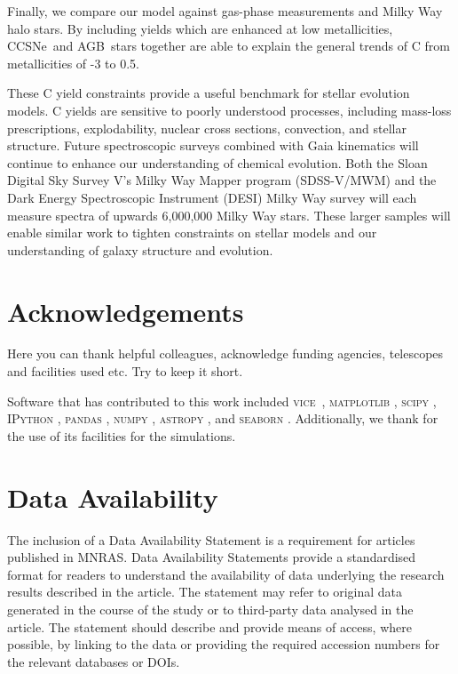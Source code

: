 \documentclass[fleqn,usenatbib]{mnras}
\newcommand{\VICE}{\textsc{vice}}
\newcommand{\agb}{AGB}
\newcommand{\cc}{CCSNe}
\begin{document}
Finally, we compare our model against gas-phase measurements and Milky Way halo stars. By including yields which are enhanced at low metallicities, \cc\ and \agb\ stars together are able to explain the general trends of C from metallicities of -3 to 0.5. 

These C yield constraints provide a useful benchmark for stellar evolution models. C yields are sensitive to poorly understood processes, including mass-loss prescriptions, explodability, nuclear cross sections, convection, and stellar structure. Future spectroscopic surveys combined with Gaia kinematics \citep{gaia} will continue to enhance our understanding of chemical evolution. Both the Sloan Digital Sky Survey V's Milky Way Mapper program ({\sc SDSS-V/MWM}) \citep{sdssv} and the Dark Energy Spectroscopic Instrument ({\sc DESI}) Milky Way survey \citep{desi, desi:mw} will each measure spectra of upwards 6,000,000 Milky Way stars. These larger samples will enable similar work to tighten constraints on stellar models and our understanding of galaxy structure and evolution.




\section*{Acknowledgements}

 Here you can thank helpful
colleagues, acknowledge funding agencies, telescopes and facilities used etc.
Try to keep it short.

Software that has contributed to this work included  
\VICE~\citep{JW20, james+21},
\textsc{matplotlib} \citep{matplotlib},
\textsc{scipy} \citep{scipy},
\textsc{IPython} \citep{ipy},
\textsc{pandas} \citep{pandas},
\textsc{numpy} \citep{numpy},
\textsc{astropy} \citep{astropy:2013, astropy:2018, astropy:2022},
and 
\textsc{seaborn} \citep{seaborn}
.
Additionally, we thank \citet{OhioSupercomputerCenter1987} for the use of its facilities for the simulations. 


\section*{Data Availability}

 
The inclusion of a Data Availability Statement is a requirement for articles published in MNRAS. Data Availability Statements provide a standardised format for readers to understand the availability of data underlying the research results described in the article. The statement may refer to original data generated in the course of the study or to third-party data analysed in the article. The statement should describe and provide means of access, where possible, by linking to the data or providing the required accession numbers for the relevant databases or DOIs.
\end{document}
